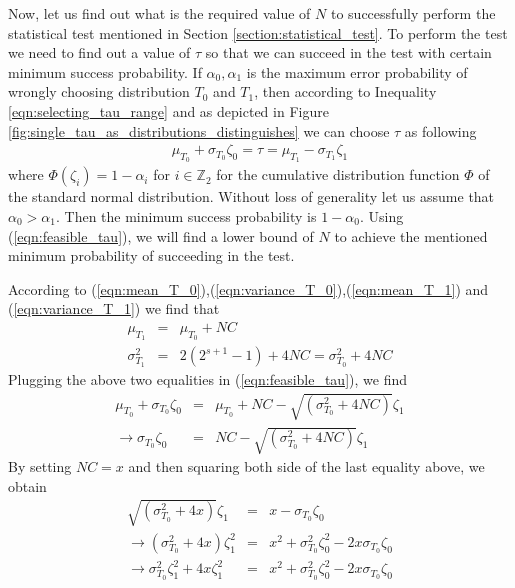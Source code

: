 Now, let us find out what is the required value of $N$ to successfully perform the statistical test mentioned in Section \ref{section:statistical_test}. To perform the test we need to find out a value of $\tau$ so that we can succeed in the test with certain minimum success probability. If $\alpha_0,\alpha_1$ is the maximum error probability of wrongly choosing distribution $T_0$ and $T_1$, then according to Inequality \ref{eqn:selecting_tau_range} and as depicted in Figure \ref{fig:single_tau_as_distributions_distinguishes} we can choose $\tau$ as following
\begin{eqnarray}
\mu_{T_0}+\sigma_{T_0}\zeta_0 = \tau = \mu_{T_1} - \sigma_{T_1}\zeta_1 \label{eqn:feasible_tausss}
\end{eqnarray}
where $\mathit{\Phi}(\zeta_i) = 1 - \alpha_i$ for $i \in \mathbb{Z}_2$ for the cumulative distribution function $\mathit{\Phi}$ of the standard normal distribution. Without loss of generality let us assume that $\alpha_0 > \alpha_1$. Then the minimum success probability is $1-\alpha_0$. Using (\ref{eqn:feasible_tau}), we will find a lower bound of $N$ to achieve the mentioned minimum probability of succeeding in the test. \par \noindent According to (\ref{eqn:mean_T_0}),(\ref{eqn:variance_T_0}),(\ref{eqn:mean_T_1}) and (\ref{eqn:variance_T_1}) we find that 
\begin{eqnarray}
\mu_{T_1} &=& \mu_{T_0} + NC\\
\sigma^2_{T_1} &=& 2\left(2^{s+1}-1\right) + 4NC = \sigma^2_{T_0} + 4NC
\end{eqnarray}
Plugging the above two equalities in (\ref{eqn:feasible_tau}), we find
\begin{eqnarray*}
\mu_{T_0}+\sigma_{T_0}\zeta_0 &=& \mu_{T_0} + NC - \sqrt{\left(\sigma^2_{T_0}+ 4NC\right)}\zeta_1\\
\rightarrow \sigma_{T_0}\zeta_0 &=& NC - \sqrt{\left(\sigma^2_{T_0}+ 4NC\right)}\zeta_1
\end{eqnarray*}
By setting $NC = x$ and then squaring both side of the last equality above, we obtain
\begin{eqnarray*}
\sqrt{\left(\sigma^2_{T_0}+ 4x\right)}\zeta_1 &=& x - \sigma_{T_0}\zeta_0\\
\rightarrow \left(\sigma^2_{T_0}+ 4x\right)\zeta^2_1 &=& x^2 + \sigma^2_{T_0}\zeta_0^2 - 2x\sigma_{T_0}\zeta_0 \\
\rightarrow \sigma^2_{T_0}\zeta^2_1 + 4x\zeta^2_1 &=& x^2 + \sigma^2_{T_0}\zeta_0^2 - 2x\sigma_{T_0}\zeta_0
\end{eqnarray*}
